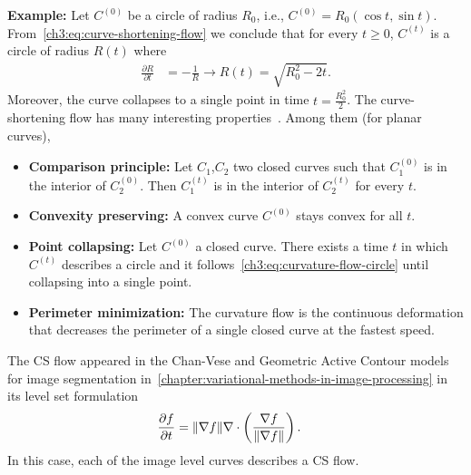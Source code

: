%
%
\textbf{Example:} Let $C^{(0)}$ be a circle of radius $R_0$, i.e.,  $C^{(0)} = R_0( \cos t, \sin t)$. From~\cref{ch3:eq:curve-shortening-flow} we conclude that for every $t \geq 0$, $C^{(t)}$ is a circle of radius $R(t)$ where
\begin{align}
	\frac{\partial R}{\partial t} &= -\frac{1}{R}  \rightarrow R(t) = \sqrt{R_0^2 - 2t}.
	\label{ch3:eq:curvature-flow-circle}
\end{align}
%
Moreover, the curve collapses to a single point in time $t=\frac{R_0^2}{2}$. The curve-shortening flow has many interesting properties~\cite{huisken84flow,gage86heat,ecker08heat}. Among them (for planar curves),

\begin{itemize}
	\item[]{\textbf{Comparison principle:} Let $C_1$,$C_2$ two closed curves such that $C_1^{(0)}$ is in the interior of $C_2^{(0)}$. Then $C_1^{(t)}$ is in the interior of $C_2^{(t)}$ for every $t$.}
	\item[]{\textbf{Convexity preserving:} A convex curve $C^{(0)}$ stays convex for all $t$.}
	\item[]{\textbf{Point collapsing:} Let $C^{(0)}$ a closed curve. There exists a time $t$ in which $C^{(t)}$ describes a circle and it follows~\cref{ch3:eq:curvature-flow-circle} until collapsing into a single point.}
	\item[]{\textbf{Perimeter minimization:} The curvature flow is the continuous deformation that decreases the perimeter of a single closed curve at the fastest speed.}
\end{itemize}


The CS flow appeared in the Chan-Vese and Geometric Active Contour models for image segmentation in~\cref{chapter:variational-methods-in-image-processing} in its level set formulation~\cite{osher88fronts}
\begin{align}
	\frac{\partial f}{\partial t} &= \lVert\nabla f\rVert\nabla \cdot \left( \frac{\nabla f}{\lVert\nabla f\rVert} \right).
	\label{ch3:eq:implicit-curvature-flow}
\end{align}
%
In this case, each of the image level curves describes a CS flow.

